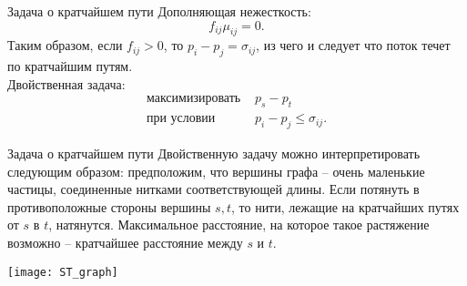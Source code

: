 \documentclass[10pt]{beamer}
\begin{document}
\begin{frame}{Задача о кратчайшем пути}
Дополняющая нежесткость:
$$
f_{ij}\mu_{ij}=0.
$$
Таким образом, если $f_{ij}>0$, то $p_i-p_j=\sigma_{ij}$, из чего и следует что поток течет по кратчайшим путям.\\ 
Двойственная задача:
$$
\begin{array}{ll}
\mbox{максимизировать } & p_s-p_t \\
\mbox{при условии }    & p_i-p_j\leq \sigma_{ij}.
\end{array}
$$
\end{frame}

\begin{frame}{Задача о кратчайшем пути}
Двойственную задачу можно интерпретировать следующим образом: предположим, что вершины графа -- очень маленькие частицы, соединенные нитками соответствующей длины. Если потянуть в противоположные стороны вершины $s,t$, то нити, лежащие на кратчайших путях от $s$ в $t$, натянутся. Максимальное расстояние, на которое такое растяжение возможно -- кратчайшее расстояние между $s$ и $t$.\\
\begin{center}
\texttt{[image: ST\_graph]}
\end{center}
\end{frame}
\end{document}
